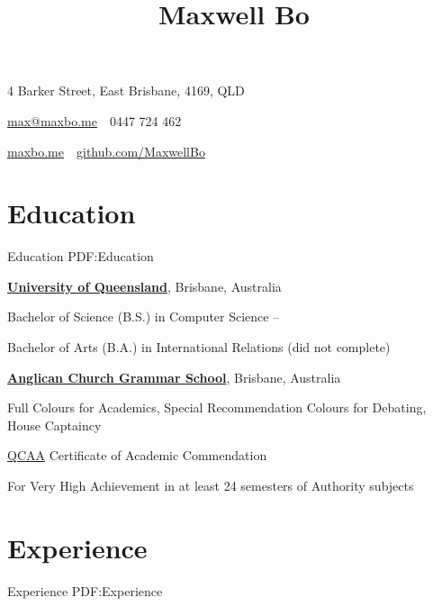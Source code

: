 \documentclass[a4paper,10pt,oneside]{article}
\begin{document}

\title{Maxwell Bo}

\begin{subtitle}
{4 Barker Street, East Brisbane, 4169, QLD}
\par

\href{mailto:max@maxbo.me}
{max@maxbo.me} \,\BulletSymbol\, 0447 724 462

\par
\href{http://maxbo.me/}
{maxbo.me} \,\BulletSymbol\, \href{https://github.com/MaxwellBo}
{github.com/MaxwellBo}



\end{subtitle}

\begin{body}


\section
{Education}
{Education}
{PDF:Education}

\href{https://www.uq.edu.au/}
{\textbf{University of Queensland}},
Brisbane, Australia
\par
Bachelor of Science (B.S.) in Computer Science
\hfill
{} --
\par
Bachelor of Arts (B.A.) in International Relations (did not complete)
\hfill
{}


\EntryGap
\href{https://www.churchie.com.au/}
{\textbf{Anglican Church Grammar School}},
Brisbane, Australia

\par
Full Colours for Academics, Special Recommendation Colours for Debating, House
Captaincy
\hfill
{}

\par
\href{https://www.qcaa.qld.edu.au/}{QCAA} Certificate of Academic Commendation
\hfill
{}
\begin{detail}
For Very High Achievement in at least 24 semesters of Authority
subjects
\end{detail}



\section
{Experience}
{Experience}
{PDF:Experience}



\end{body}
\end{document}
